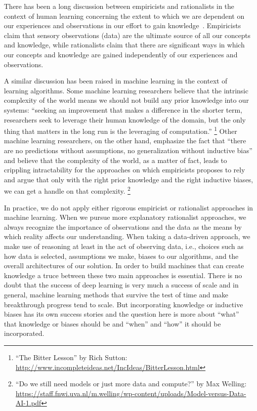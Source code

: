 There has been a long discussion between empiricists and rationalists in the context of human learning concerning the extent to which we are dependent on our experiences and observations in our effort to gain knowledge~\citep{markie2004rationalism}.  
%
Empiricists claim that sensory observations (data) are the ultimate source of all our concepts and knowledge, while rationalists claim that there are significant ways in which our concepts and knowledge are gained independently of our experiences and observations. 

A similar discussion has been raised in machine learning in the context of learning algorithms.
%
Some machine learning researchers believe that the intrinsic complexity of the world means we should not build any prior knowledge into our systems: ``seeking an improvement that makes a difference in the shorter term, researchers seek to leverage their human knowledge of the domain, but the only thing that matters in the long run is the leveraging of computation.''%
\footnote{``The Bitter Lesson'' by Rich Sutton: \url{http://www.incompleteideas.net/IncIdeas/BitterLesson.html}}
%
Other machine learning researchers, on the other hand, emphasize the fact that ``there are no predictions without assumptions, no generalization without inductive bias'' and believe that the complexity of the world, as a matter of fact, leads to crippling intractability for the approaches on which empiricists proposes to rely and argue that only with the right prior knowledge and the right inductive biases, we can get a handle on that complexity.
\footnote{``Do we still need models or just more data and compute?'' by Max Welling: \url{https://staff.fnwi.uva.nl/m.welling/wp-content/uploads/Model-versus-Data-AI-1.pdf}}

In practice, we do not apply either rigorous empiricist or rationalist approaches in machine learning.  When we pursue more explanatory rationalist approaches, we always recognize the importance of observations and the data as the means by which reality affects our understanding.  When taking a data-driven approach, we make use of reasoning at least in the act of observing data, i.e., choices such as how data is selected, assumptions we make, biases to our algorithms, and the overall architectures of our solution.
%
In order to build machines that can create knowledge a truce between these two main approaches is essential.
There is no doubt that the success of deep learning is very much a success of scale and in general, machine learning methods that survive the test of time and make breakthrough progress tend to scale.
But incorporating knowledge or inductive biases has its own success stories and the question here is more about ``what'' that knowledge or biases should be and ``when'' and ``how'' it should be incorporated. 

